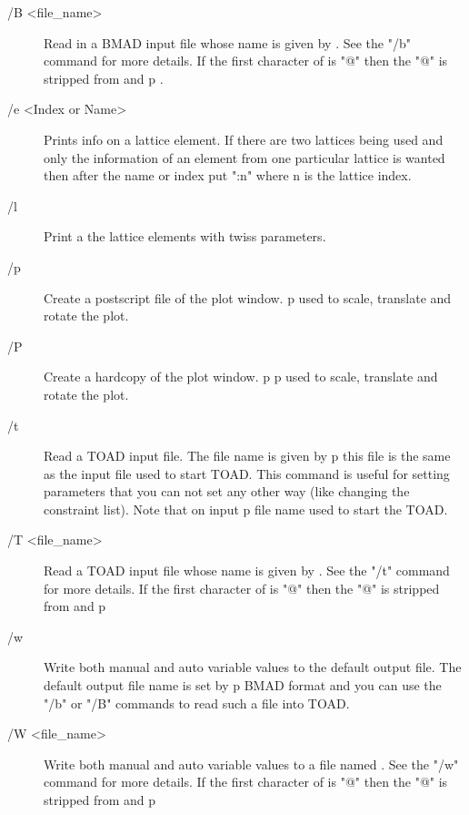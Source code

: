 \begin{description}
\item[/B <file\_name>]   
Read in a BMAD input file whose name is given by . See the
"/b" command for more details. If the first character of  is
"@" then the "@" is stripped from   and p%
.

\item[/e <Index or Name>]
Prints info on a lattice element. If there are two lattices being used
and only the information of an element from one particular lattice is wanted
then after the name or index put ":n" where n is the lattice index.

\item[/l]
Print a the lattice elements with twiss parameters.

\item[/p]
Create a postscript file of the plot window.
p%
used to scale, translate and rotate the plot.

\item[/P]
Create a hardcopy of the plot window.
p%
p%
used to scale, translate and rotate the plot.

\item[/t]
Read a TOAD input file. The file name is given by p%
this file is the same as the input file used to start TOAD. This command is
useful for setting parameters that you can not set any other way (like
changing the constraint list). Note that on input p%
file name used to start the TOAD.

\item[/T <file\_name>]
Read a TOAD input file whose name is given by .
See the "/t" command for more details.
If the first character of  is "@" then the "@" is stripped
from   and p%

\item[/w]
Write both manual and auto variable values to the default output file. 
The default output file name is set by p%
BMAD format and you can use the "/b" or "/B" commands to read such a file into
TOAD.

\item[/W <file\_name>]
Write both manual and auto variable values to a file named
. See the "/w" command for more details.
If the first character of  is "@" then the "@" is stripped
from   and p%


\end{description}
